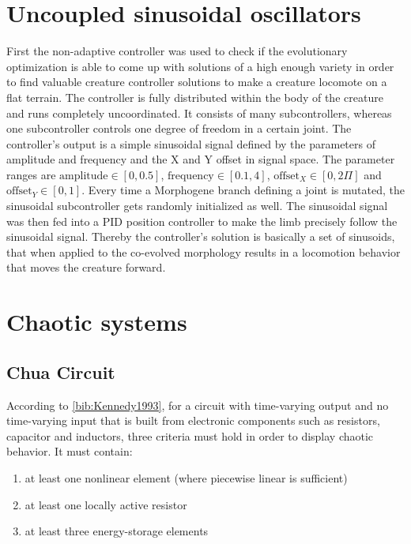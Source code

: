 \documentclass[main]{subfiles}
\begin{document}
\section{Uncoupled sinusoidal oscillators}
\label{sec:sinusoidal-oscillators}

First the non-adaptive controller was used to check if the evolutionary optimization is able to come up with solutions of a high enough variety in order to find valuable creature controller solutions to make a creature locomote on a flat terrain. The controller is fully distributed within the body of the creature and runs completely uncoordinated. It consists of many subcontrollers, whereas one subcontroller controls one degree of freedom in a certain joint. The controller's output is a simple sinusoidal signal defined by the parameters of amplitude and frequency and the X and Y offset in signal space. The parameter ranges are $\text{amplitude} \in [0,0.5]$, $\text{frequency} \in [0.1,4]$, $\text{offset}_X \in [0,2\Pi]$ and $\text{offset}_Y \in [0,1]$. Every time a Morphogene branch defining a joint is mutated, the sinusoidal subcontroller gets randomly initialized as well. The sinusoidal signal was then fed into a PID position controller to make the limb precisely follow the sinusoidal signal. Thereby the controller's solution is basically a set of sinusoids, that when applied to the co-evolved morphology results in a locomotion behavior that moves the creature forward. 

\section{Chaotic systems}

\lipsum[2]

\subsection{Chua Circuit}
\label{subsec:chua-circuit}

According to \ref{bib:Kennedy1993}, for a circuit with time-varying output and no time-varying input that is built from electronic components such as resistors, capacitor and inductors, three criteria must hold in order to display chaotic behavior. It must contain:
  \begin{enumerate}
  \item at least one nonlinear element (where piecewise linear is sufficient)
  \item at least one locally active resistor
  \item at least three energy-storage elements
  \end{enumerate}
  
\end{document}
